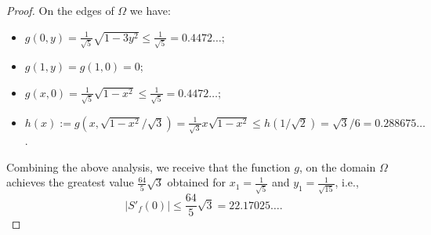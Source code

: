 \documentclass{amsart}
\begin{document}
\begin{proof}
\medskip

On the edges of $\Omega$ we have:
\begin{itemize}
  \item[-] $g(0,y)=\frac{1}{\sqrt5}\sqrt{1-3 y^2}\le \frac{1}{\sqrt5} = 0.4472\ldots;$
  \item[-] $g(1,y) = g(1,0) = 0$;
  \item[-] $g(x,0) = \frac{1}{\sqrt5}\sqrt{1-x^2}\le \frac{1}{\sqrt5} = 0.4472\ldots;$
  \item[-] $h(x):=g\left(x, \sqrt{1-x^2}/\sqrt3\right) = \frac{1}{\sqrt3}x\sqrt{1-x^2}\le h(1/\sqrt2) = \sqrt3/6 = 0.288675\ldots$.
\end{itemize}
Combining the above analysis, we receive that the function $g$, on the domain $\Omega$ achieves the greatest value $\frac{64}{5}\sqrt{3}$ obtained for $x_1=\frac{1}{\sqrt5}$ and $y_1=\frac{1}{\sqrt{15}}$, i.e.,
\[|S'_{f}(0)|\leq \frac{64}{5}\sqrt{3}=22.17025\ldots.\]
\end{proof}

\medskip
\end{document}
